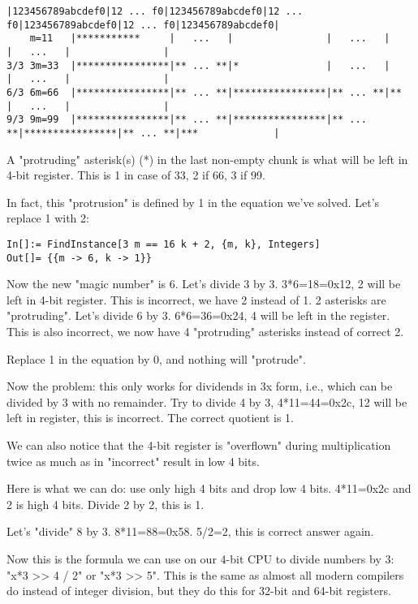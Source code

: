 \begin{lstlisting}[basicstyle=\footnotesize]
           |123456789abcdef0|12 ... f0|123456789abcdef0|12 ... f0|123456789abcdef0|12 ... f0|123456789abcdef0|
    m=11   |***********     |   ...   |                |   ...   |                |   ...   |                |
3/3 3m=33  |****************|** ... **|*               |   ...   |                |   ...   |                |
6/3 6m=66  |****************|** ... **|****************|** ... **|**              |   ...   |                |
9/3 9m=99  |****************|** ... **|****************|** ... **|****************|** ... **|***             |
\end{lstlisting}

A "protruding" asterisk(s) (*) in the last non-empty chunk is what will be left in 4-bit register.
This is 1 in case of 33, 2 if 66, 3 if 99.

In fact, this "protrusion" is defined by 1 in the equation we've solved.
Let's replace 1 with 2:

\begin{lstlisting}
In[]:= FindInstance[3 m == 16 k + 2, {m, k}, Integers]
Out[]= {{m -> 6, k -> 1}}
\end{lstlisting}

Now the new "magic number" is 6.
Let's divide 3 by 3. 3*6=18=0x12, 2 will be left in 4-bit register. This is incorrect, we have 2 instead of 1. 2 asterisks are "protruding".
Let's divide 6 by 3. 6*6=36=0x24, 4 will be left in the register. This is also incorrect, we now have 4 "protruding" asterisks instead of correct 2.

Replace 1 in the equation by 0, and nothing will "protrude".

Now the problem: this only works for dividends in 3x form, i.e., which can be divided by 3 with no remainder.
Try to divide 4 by 3, 4*11=44=0x2c, 12 will be left in register, this is incorrect.
The correct quotient is 1.

We can also notice that the 4-bit register is "overflown" during multiplication twice as much as in "incorrect" result in low 4 bits.

Here is what we can do: use only high 4 bits and drop low 4 bits.
4*11=0x2c and 2 is high 4 bits.
Divide 2 by 2, this is 1.

Let's "divide" 8 by 3. 8*11=88=0x58. 5/2=2, this is correct answer again.

Now this is the formula we can use on our 4-bit CPU to divide numbers by 3: "x*3 >> 4 / 2" or "x*3 >> 5".
This is the same as almost all modern compilers do instead of integer division, but they do this for 32-bit and 64-bit registers.

